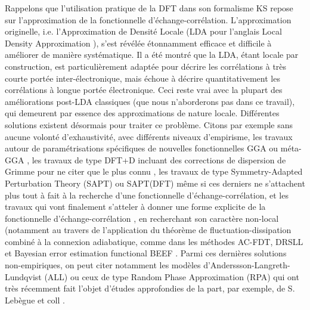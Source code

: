 	Rappelons que l’utilisation pratique de la DFT dans son formalisme KS repose sur l’approximation de la fonctionnelle d’échange-corrélation. L’approximation originelle, i.e. l’Approximation de Densité Locale (LDA pour l’anglais \og Local Density Approximation \fg), s’est révélée étonnamment efficace et difficile à améliorer de manière systématique. Il a été montré que la LDA, étant locale par construction, est particulièrement adaptée pour décrire les corrélations à très courte portée inter-électronique, mais échoue à décrire quantitativement les corrélations à longue portée électronique. Ceci reste vrai avec la plupart des améliorations post-LDA classiques (que nous n’aborderons pas dans ce travail), qui demeurent par essence des approximations de nature locale. Différentes solutions existent désormais pour traiter ce problème. Citons par exemple sans aucune volonté d’exhaustivité, avec différents niveaux d’empirisme, les travaux autour de paramétrisations spécifiques de nouvelles fonctionnelles GGA ou méta-GGA \cite{valero2006nonadiabatic}, les travaux de type DFT+D incluant des corrections de dispersion de Grimme pour ne citer que le plus connu \cite{grimme2006semiempirical,grimme2010consistent}, les travaux de type Symmetry-Adapted Perturbation Theory (SAPT) ou SAPT(DFT) même si ces derniers ne s’attachent plus tout à fait à la recherche d’une fonctionnelle d’échange-corrélation, et les travaux qui vont finalement s’atteler à donner une forme explicite de la fonctionnelle d’échange-corrélation \cite{klimevs2012perspective,tran2013nonlocal}, en recherchant son caractère non-local (notamment au travers de l’application du théorème de fluctuation-dissipation combiné à la connexion adiabatique, comme dans les méthodes AC-FDT, DRSLL \cite{dion2004van,wellendorff2012density}  et Bayesian error estimation functional BEEF \cite{wellendorff2012density}. Parmi ces dernières solutions non-empiriques, on peut citer notamment les modèles d’Anderssson-Langreth-Lundqvist (ALL) ou ceux de type Random Phase Approximation (RPA) qui ont très récemment fait l’objet d’études approfondies de la part, par exemple, de S. Lebègue et coll \cite{lebegue2010cohesive,mussard2013modelisations}.\\
	
